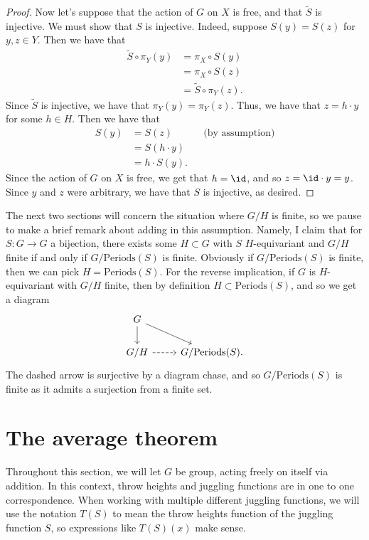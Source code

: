 \documentclass[12nt]{article}
\theoremstyle{plain}
\begin{document}
\begin{proof}
Now let's suppose that the action of $G$ on $X$ is free, and that $\widetilde{S}$ is injective. We must show that $S$ is injective. Indeed, suppose $S(y) = S(z)$ for $y, z \in Y$. Then we have that 
\begin{align*}
\widetilde{S} \circ \pi_Y(y) &= \pi_X \circ S(y) \\
	&= \pi_X \circ S(z) \\
	&= \widetilde{S} \circ \pi_Y(z).
\end{align*}
Since $\widetilde{S}$ is injective, we have that $\pi_Y(y) = \pi_Y(z)$. Thus, we have that $z = h \cdot y$ for some $h \in H$. Then we have that 
\begin{align*}
S(y) &= S(z) && \text{(by assumption)} \\
	&= S(h \cdot y) \\
	&= h \cdot S(y).
\end{align*}
Since the action of $G$ on $X$ is free, we get that $h = \id$, and so $z = \id \cdot y = y$. Since $y$ and $z$ were arbitrary, we have that $S$ is injective, as desired.

\end{proof}

The next two sections will concern the situation where $G/H$ is finite, so we pause to make a brief remark about adding in this assumption. Namely, I claim that for $S : G \to G$ a bijection, there exists some $H \subset G$ with $S$ $H$-equivariant and $G/H$ finite if and only if $G/\text{Periods}(S)$ is finite. Obviously if $G/\text{Periods}(S)$ is finite, then we can pick $H = \text{Periods}(S)$. For the reverse implication, if $G$ is $H$-equivariant with $G/H$ finite, then by definition $H \subset \text{Periods}(S)$, and so we get a diagram
\[
\begin{tikzcd}
G \ar[d] \ar[dr] \\
G/H \ar[r, dashed] & G/\text{Periods}(S).
\end{tikzcd}
\]
The dashed arrow is surjective by a diagram chase, and so $G/\text{Periods}(S)$ is finite as it admits a surjection from a finite set.

\section{The average theorem}

Throughout this section, we will let $G$ be group, acting freely on itself via addition. In this context, throw heights and juggling functions are in one to one correspondence. When working with multiple different juggling functions, we will use the notation $T(S)$ to mean the throw heights function of the juggling function $S$, so expressions like $T(S)(x)$ make sense. 
\end{document}
